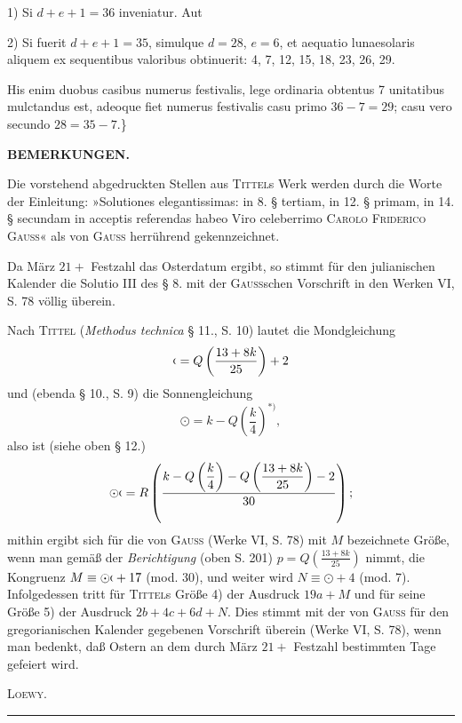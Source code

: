 1) Si $d+e+1=36$ inveniatur. Aut

2) Si fuerit $d+e+1=35$, simulque $d=28$, $e=6$, et aequatio lunaesolaris aliquem ex sequentibus valoribus obtinuerit: 4, 7, 12, 15, 18, 23, 26, 29.

His enim duobus casibus numerus festivalis, lege ordinaria obtentus 7 unitatibus mulctandus est, adeoque fiet numerus festivalis casu primo $36-7=29$; casu vero secundo $28=35-7$.\}
\clearpage{}
\begin{center}\textbf{BEMERKUNGEN.}\end{center}
\begingroup\small
\noindent\hspace*{\parindent}Die vorstehend abgedruckten Stellen aus \textsc{Tittel}s Werk werden durch die Worte der Einleitung: »Solutiones elegantissimas: in 8. § tertiam, in 12. § primam, in 14. § secundam in acceptis referendas habeo Viro celeberrimo \textsc{Carolo Friderico Gauss}« als von \textsc{Gauss} herrührend gekennzeichnet.

Da März $21+{}$ Festzahl das Osterdatum ergibt, so stimmt für den julianischen Kalender die Solutio III des § 8. mit der \textsc{Gauss}schen Vorschrift in den Werken VI, S. 78 völlig überein.

Nach \textsc{Tittel} (\textit{Methodus technica} § 11., S. 10) lautet die Mondgleichung
\[
\ChronMoon=Q\left(\frac{13+8k}{25}\right)+2
\]
\noindent und (ebenda § 10., S. 9) die Sonnengleichung
\[
\odot=k-Q\left(\frac{k}{4}\right)^{*)},
\]
\begingroup\renewcommand{\thefootnote}{}\endgroup
\noindent also ist (siehe oben § 12.)
\[
\odot\ChronMoon=R\left(\frac{k-Q\left(\dfrac{k}{4}\right)-Q\left(\dfrac{13+8k}{25}\right)-2}{30}\right);
\]
\noindent mithin ergibt sich für die von \textsc{Gauss} (Werke VI, S. 78) mit $M$ bezeichnete Größe, wenn man gemäß der \textit{Berichtigung} (oben S. 201) $p=Q\left(\frac{13+8k}{25}\right)$ nimmt, die Kongruenz $M\equiv\odot\ChronMoon+17$ (mod. 30), und weiter wird $N\equiv\odot+4$ (mod. 7). Infolgedessen tritt für \textsc{Tittel}s Größe 4) der Ausdruck $19a+M$ und für seine Größe 5) der Ausdruck $2b+4c+6d+N$. Dies stimmt mit der von \textsc{Gauss} für den gregorianischen Kalender gegebenen Vorschrift überein (Werke VI, S. 78), wenn man bedenkt, daß Ostern an dem durch März $21+{}$ Festzahl bestimmten Tage gefeiert wird.
\begin{flushright}\textsc{Loewy.}\end{flushright}
\endgroup
\begin{center}\rule{.24\textwidth}{.35pt}\end{center}
\clearpage\endgroup
